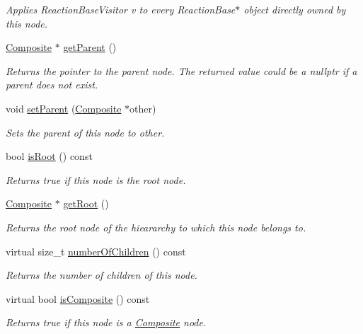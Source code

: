 \begin{DoxyCompactItemize}
\begin{DoxyCompactList}\small\item\em Applies Reaction\+Base\+Visitor v to every Reaction\+Base$\ast$ object directly owned by this node. \end{DoxyCompactList}\item 
\hyperlink{classComposite}{Composite} $\ast$ \hyperlink{classComponent_a4bb9041a7f3854f25f45060e81bb4e4e}{get\+Parent} ()
\begin{DoxyCompactList}\small\item\em Returns the pointer to the parent node. The returned value could be a nullptr if a parent does not exist. \end{DoxyCompactList}\item 
void \hyperlink{classComponent_a9d5b03697a653cda24d5688af1d105f8}{set\+Parent} (\hyperlink{classComposite}{Composite} $\ast$other)
\begin{DoxyCompactList}\small\item\em Sets the parent of this node to other. \end{DoxyCompactList}\item 
bool \hyperlink{classComponent_a4f0bed8144509d6565a30b548fac0fe7}{is\+Root} () const 
\begin{DoxyCompactList}\small\item\em Returns true if this node is the root node. \end{DoxyCompactList}\item 
\hyperlink{classComposite}{Composite} $\ast$ \hyperlink{classComponent_abcb3746cb8b4afcecf437dce40c0c772}{get\+Root} ()
\begin{DoxyCompactList}\small\item\em Returns the root node of the hieararchy to which this node belongs to. \end{DoxyCompactList}\item 
virtual size\+\_\+t \hyperlink{classComponent_a42566ba7ad92afe0d84d9d1d4e05745e}{number\+Of\+Children} () const 
\begin{DoxyCompactList}\small\item\em Returns the number of children of this node. \end{DoxyCompactList}\item 
virtual bool \hyperlink{classComponent_a14bcb60799865752cd293fba2076d84a}{is\+Composite} () const 
\begin{DoxyCompactList}\small\item\em Returns true if this node is a \hyperlink{classComposite}{Composite} node. \end{DoxyCompactList}\item 

\end{DoxyCompactItemize}
